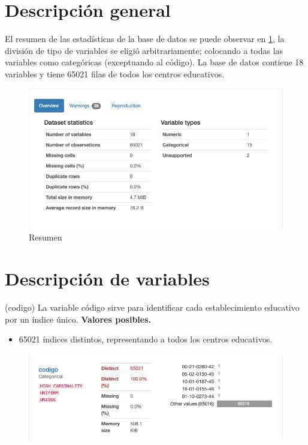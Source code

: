 






\section{Descripción general}

El resumen de las estadísticas de la base de datos se puede observar en \ref{fig: 1}, la división de tipo de variables se eligió arbitrariamente; colocando a todas las variables como categóricas (exceptuando al código). La base de datos contiene 18 variables y tiene 65021 filas de todos los centros educativos. 
	\begin{figure}[H]
	\centering
	\includegraphics[scale=0.5]{Images/0}
	\caption{Resumen}
	\label{fig: 1}
\end{figure}

\newpage

\section{Descripción de variables}

\begin{variable}(codigo) 
	La variable código sirve para identificar cada establecimiento educativo por un índice único. 
	\bigbreak 
	\textbf{Valores posibles.}
	\begin{itemize}
		\item 65021 índices distintos, representando a todos los centros educativos. 
	\end{itemize}
	\begin{figure}[H]
		\centering
		\includegraphics[scale=0.5]{Images/1}
	\end{figure}
\end{variable}

